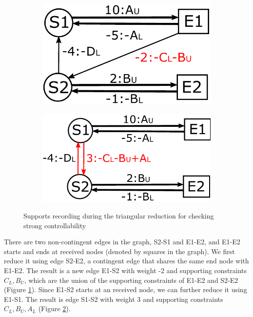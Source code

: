 \documentclass[jair,twoside,11pt,theapa]{article}
\begin{document}
\begin{figure}[ht!]
\begin{subfigure}[b]{0.22\textwidth}
		\includegraphics[width=\textwidth]{figures/sc_reduction_3.pdf}
		\caption{}
		\label{fig:sc_reduction_3}
	\end{subfigure}
	\begin{subfigure}[b]{0.26\textwidth}
		\includegraphics[width=\textwidth]{figures/sc_reduction_4.pdf}
		\caption{}
		\label{fig:sc_reduction_4}
	\end{subfigure}
	\caption{Supports recording during the triangular reduction for checking strong controllability}
	\label{fig:sc_reduction}
\end{figure}


There are two non-contingent edges in the graph, S2-S1 and E1-E2, and E1-E2
starts and ends at received nodes (denoted by squares in the graph). We first
reduce it using edge S2-E2, a contingent edge that shares the same end node with
E1-E2. The result is a new edge E1-S2 with weight -2 and supporting constraints
$C_L,B_U$, which are the union of the supporting constraints of E1-E2 and S2-E2
(Figure \ref{fig:sc_reduction_3}). Since E1-S2 starts at an received node, we
can further reduce it using E1-S1. The result is edge S1-S2 with weight 3 and
supporting constraints $C_L, B_U, A_L$ (Figure \ref{fig:sc_reduction_4}).
\end{document}

